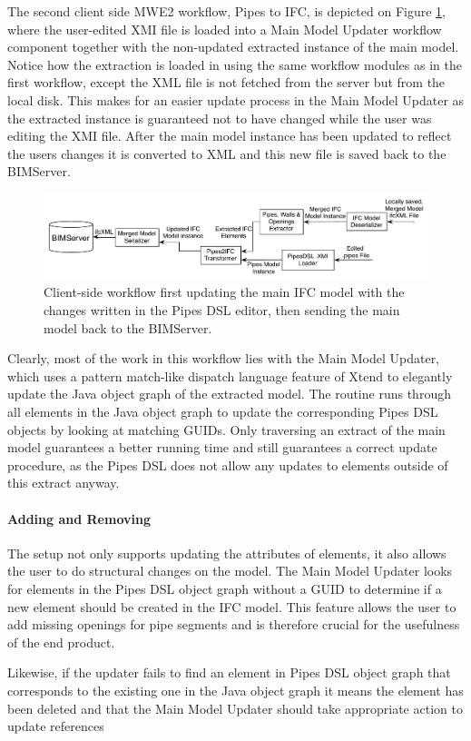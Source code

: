 The second client side MWE2 workflow, Pipes to IFC, is depicted on Figure \ref{fig:Pipes2IFCWorkflow}, where the user-edited XMI file is loaded into a Main Model Updater workflow component together with the non-updated extracted instance of the main model. Notice how the extraction is loaded in using the same workflow modules as in the first workflow, except the XML file is not fetched from the server but from the local disk. This makes for an easier update process in the Main Model Updater as the extracted instance is guaranteed not to have changed while the user was editing the XMI file. After the main model instance has been updated to reflect the users changes it is converted to XML and this new file is saved back to the BIMServer.

\begin{figure}[t]
    \centering
        \includegraphics[width=120mm]{images/Pipes2IFC.pdf}
    \caption{Client-side workflow first updating the main IFC model with the changes written in the Pipes DSL editor, then sending the main model back to the BIMServer.}
    \label{fig:Pipes2IFCWorkflow}
\end{figure}

Clearly, most of the work in this workflow lies with the Main Model Updater, which uses a pattern match-like dispatch language feature of Xtend to elegantly update the Java object graph of the extracted model. The routine runs through all elements in the Java object graph to update the corresponding Pipes DSL objects by looking at matching GUIDs. Only traversing an extract of the main model guarantees a better running time and still guarantees a correct update procedure, as the Pipes DSL does not allow any updates to elements outside of this extract anyway.

\paragraph{Adding and Removing} The setup not only supports updating the attributes of elements, it also allows the user to do structural changes on the model. The Main Model Updater looks for elements in the Pipes DSL object graph without a GUID to determine if a new element should be created in the IFC model. This feature allows the user to add missing openings for pipe segments and is therefore crucial for the usefulness of the end product.

Likewise, if the updater fails to find an element in Pipes DSL object graph that corresponds to the existing one in the Java object graph it means the element has been deleted and that the Main Model Updater should take appropriate action to update references

